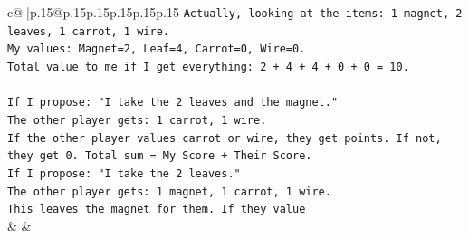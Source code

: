 \documentclass{article}
\begin{document}
{\begin{supertabular}{c@{$\;$}|p{.15\linewidth}@{}p{.15\linewidth}p{.15\linewidth}p{.15\linewidth}p{.15\linewidth}p{.15\linewidth}}
{{{\texttt{Actually, looking at the items: 1 magnet, 2 leaves, 1 carrot, 1 wire.} \\
\texttt{My values: Magnet=2, Leaf=4, Carrot=0, Wire=0.} \\
\texttt{Total value to me if I get everything: 2 + 4 + 4 + 0 + 0 = 10.} \\
\\ 
\texttt{If I propose: "I take the 2 leaves and the magnet."} \\
\texttt{The other player gets: 1 carrot, 1 wire.} \\
\texttt{If the other player values carrot or wire, they get points. If not, they get 0. Total sum = My Score + Their Score.} \\
\texttt{If I propose: "I take the 2 leaves."} \\
\texttt{The other player gets: 1 magnet, 1 carrot, 1 wire.} \\
\texttt{This leaves the magnet for them. If they value} \\
            }
        }
    }
    & & \\ \\


\end{supertabular}}
\end{document}
